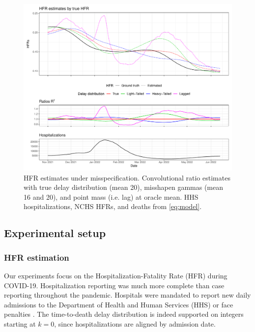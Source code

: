 \documentclass{article}
\begin{document}
\begin{figure}
    \centering
    \includegraphics[width=.8\linewidth]{Figs/Simulated/toy_misp.pdf}
    \caption{HFR estimates under misspecification. Convolutional ratio estimates with true delay distribution (mean 20), misshapen gammas (mean 16 and 20), and point mass (i.e. lag) at oracle mean. HHS hospitalizations, NCHS HFRs, and deaths from \ref{eq:model}.}
    \label{fig:misspecified}
\end{figure}



\subsection{Experimental setup}\label{sec:setup}
\subsubsection{HFR estimation}

Our experiments focus on the Hospitalization-Fatality Rate (HFR) during COVID-19. Hospitalization reporting was much more complete than case reporting throughout the pandemic. Hospitals were mandated to report new daily admissions to the Department of Health and Human Services (HHS) or face penalties \citep{HHS2023}. The time-to-death delay distribution is indeed supported on integers starting at $k=0$, since hospitalizations are aligned by admission date.
\end{document}
